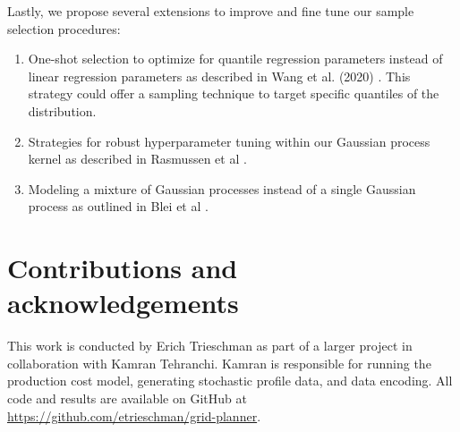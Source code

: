 \documentclass[10pt,twocolumn,letterpaper]{article}
\begin{document}
Lastly, we propose several extensions to improve and fine tune our sample selection procedures:
\begin{enumerate}
        \item One-shot selection to optimize for quantile regression parameters instead of linear regression parameters as described in Wang et al. (2020) \cite{wang2020optimal}. This strategy could offer a sampling technique to target specific quantiles of the distribution.
        \item Strategies for robust hyperparameter tuning within our Gaussian process kernel as described in Rasmussen et al \cite{Rasmussen}.
        \item Modeling a mixture of Gaussian processes instead of a single Gaussian process as outlined in Blei et al \cite{Blei_2017}.
\end{enumerate}


\section{Contributions and acknowledgements}
\label{sec:contrib}
This work is conducted by Erich Trieschman as part of a larger project in collaboration with Kamran Tehranchi. Kamran is responsible for running the production cost model, generating stochastic profile data, and data encoding. All code and results are available on GitHub at \url{https://github.com/etrieschman/grid-planner}.

{\small


}
\end{document}
